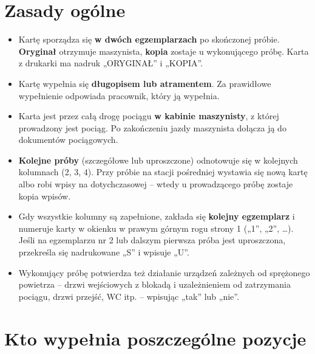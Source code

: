 \section{Zasady ogólne}

\begin{itemize}
	\item Kartę sporządza się \textbf{w dwóch egzemplarzach} po skończonej próbie. \textbf{Oryginał} otrzymuje maszynista, \textbf{kopia} zostaje u wykonującego próbę. Karta z drukarki ma nadruk „ORYGINAŁ” i „KOPIA”.
	\item Kartę wypełnia się \textbf{długopisem lub atramentem}. Za prawidłowe wypełnienie odpowiada pracownik, który ją wypełnia.
	\item Karta jest przez całą drogę pociągu \textbf{w kabinie maszynisty}, z której prowadzony jest pociąg. Po zakończeniu jazdy maszynista dołącza ją do dokumentów pociągowych.
	\item \textbf{Kolejne próby} (szczegółowe lub uproszczone) odnotowuje się w kolejnych kolumnach (2, 3, 4). Przy próbie na stacji pośredniej wystawia się nową kartę albo robi wpisy na dotychczasowej – wtedy u prowadzącego próbę zostaje kopia wpisów.
	\item Gdy wszystkie kolumny są zapełnione, zakłada się \textbf{kolejny egzemplarz} i numeruje karty w okienku w prawym górnym rogu strony 1 („1”, „2”, …). Jeśli na egzemplarzu nr 2 lub dalszym pierwsza próba jest uproszczona, przekreśla się nadrukowane „S” i wpisuje „U”.
	\item Wykonujący próbę potwierdza też działanie urządzeń zależnych od sprężonego powietrza – drzwi wejściowych z blokadą i uzależnieniem od zatrzymania pociągu, drzwi przejść, WC itp. – wpisując „tak” lub „nie”.
\end{itemize}

\section{Kto wypełnia poszczególne pozycje}

